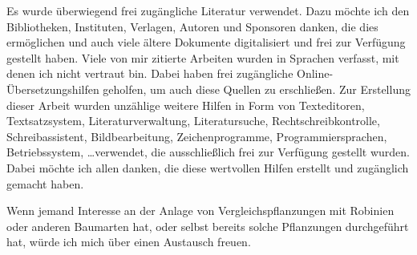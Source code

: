 \documentclass[twocolumn]{scrartcl}
\begin{document}
Es wurde überwiegend frei zugängliche Literatur verwendet. Dazu möchte ich den
Bibliotheken, Instituten, Verlagen, Autoren und Sponsoren danken, die dies
ermöglichen und auch viele ältere Dokumente digitalisiert und frei zur Verfügung
gestellt haben. Viele von mir zitierte Arbeiten wurden in Sprachen verfasst, mit
denen ich nicht vertraut bin. Dabei haben frei zugängliche
Online-Übersetzungshilfen geholfen, um auch diese Quellen zu erschließen. Zur
Erstellung dieser Arbeit wurden unzählige weitere Hilfen in Form von
Texteditoren, Textsatzsystem, Literaturverwaltung, Literatursuche,
Rechtschreibkontrolle, Schreibassistent, Bildbearbeitung, Zeichenprogramme,
Programmiersprachen, Betriebssystem, \dots verwendet, die ausschließlich frei
zur Verfügung gestellt wurden. Dabei möchte ich allen danken, die diese
wertvollen Hilfen erstellt und zugänglich gemacht haben.

Wenn jemand Interesse an der Anlage von Vergleichspflanzungen mit Robinien oder anderen Baumarten hat, oder selbst bereits solche Pflanzungen durchgeführt hat, würde ich mich über einen Austausch freuen.


%
\printbibliography

\end{document}
